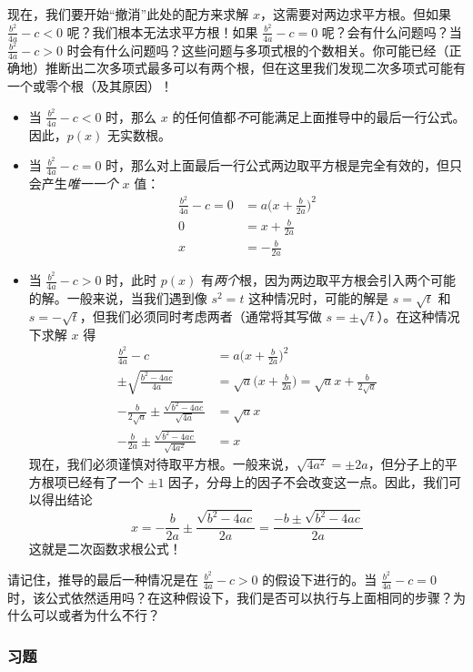 现在，我们要开始``撤消''此处的配方来求解 $x$，这需要对两边求平方根。但如果 $\frac{b^2}{4a} -c < 0$ 呢？我们根本无法求平方根！如果 $\frac{b^2}{4a} -c = 0$ 呢？会有什么问题吗？当 $\frac{b^2}{4a} -c > 0$ 时会有什么问题吗？这些问题与多项式根的个数相关。你可能已经（正确地）推断出二次多项式最多可以有两个根，但在这里我们发现二次多项式可能有一个或零个根（及其原因）！

\begin{itemize}
    \item 当 $\frac{b^2}{4a} -c < 0$ 时，那么 $x$ 的任何值都\emph{不}可能满足上面推导中的最后一行公式。因此，$p(x)$ 无实数根。
    \item 当 $\frac{b^2}{4a} -c = 0$ 时，那么对上面最后一行公式两边取平方根是完全有效的，但只会产生\emph{唯一一个} $x$ 值：
    \begin{align*}
        \frac{b^2}{4a} -c = 0 &= a\Big(x+\frac{b}{2a}\Big)^2 \\
        0 &= x+\frac{b}{2a} \\
        x &= -\frac{b}{2a}
    \end{align*}
    \item 当 $\frac{b^2}{4a} -c > 0$ 时，此时 $p(x)$ 有\emph{两个}根，因为两边取平方根会引入两个可能的解。一般来说，当我们遇到像 $s^2 = t$ 这种情况时，可能的解是 $s =\sqrt{t}$ 和 $s = -\sqrt{t}$，但我们必须同时考虑两者（通常将其写做 $s = \pm\sqrt{t}$）。在这种情况下求解 $x$ 得
    \begin{align*}
        \frac{b^2}{4a} -c &= a\Big(x+\frac{b}{2a}\Big)^2 \\
        \pm\sqrt{\frac{b^2-4ac}{4a}} &= \sqrt{a}\Big(x+\frac{b}{2a}\Big) = \sqrt{a}x+\frac{b}{2\sqrt{a}} \\
        -\frac{b}{2\sqrt{a}}\pm\frac{\sqrt{b^2-4ac}}{\sqrt{4a}} &= \sqrt{a}x \\
        -\frac{b}{2a}\pm\frac{\sqrt{b^2-4ac}}{\sqrt{4a^2}} &= x
    \end{align*}
    现在，我们必须谨慎对待取平方根。一般来说，$\sqrt{4a^2} = \pm2a$，但分子上的平方根项已经有了一个 $\pm1$ 因子，分母上的因子不会改变这一点。因此，我们可以得出结论
    \[x = -\frac{b}{2a}\pm\frac{\sqrt{b^2-4ac}}{2a} = \frac{-b\pm\sqrt{b^2-4ac}}{2a}\]
    这就是二次函数求根公式！
\end{itemize}

请记住，推导的最后一种情况是在 $\frac{b^2}{4a} -c > 0$ 的假设下进行的。当 $\frac{b^2}{4a} -c = 0$ 时，该公式依然适用吗？在这种假设下，我们是否可以执行与上面相同的步骤？为什么可以或者为什么不行？

\subsubsection*{习题}

